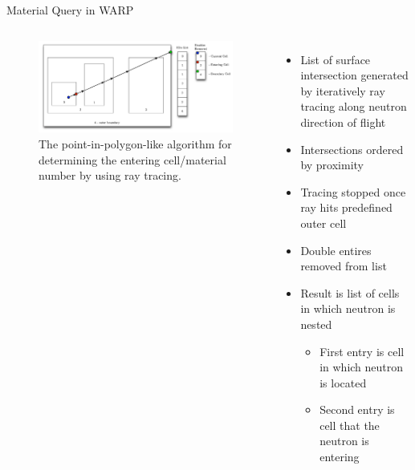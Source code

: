 \documentclass[xcolor=x11names,compress, handout]{beamer}
\renewcommand{\(}{\begin{columns}}
\renewcommand{\)}{\end{columns}}
\newcommand{\<}[1]{\begin{column}{#1}}
\renewcommand{\>}{\end{column}}
\begin{document}
\begin{frame}{Material Query in WARP \cite{warp2015}}
\pause
\begin{columns}
	\begin{figure}[h!]
	\includegraphics[width=2.5 in]{../figs/whereami}
	\caption{The point-in-polygon-like algorithm for determining the entering cell/material number by 
	using ray tracing. \label{whereami}}
	\end{figure}
	\begin{itemize}
	\pause
	\item{List of surface intersection generated by iteratively ray tracing along neutron direction of
	flight}
	\pause
	\item{Intersections ordered by proximity}
	\pause
	\item{Tracing stopped once ray hits predefined outer cell}
	\pause
	\item{Double entires removed from list}
	\pause
	\item{Result is list of cells in which neutron is nested}
		\begin{itemize}
		\pause
		\item{First entry is cell in which neutron is located}
		\pause
		\item{Second entry is cell that the neutron is entering}
		\end{itemize}
	\end{itemize}
\end{columns}
\end{frame}
\end{document}
